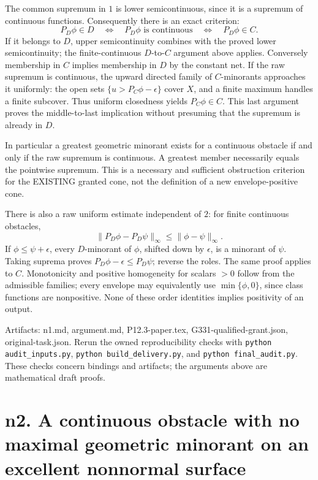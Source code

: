 \documentclass[11pt]{article}
\begin{document}
The common supremum in \(1\) is lower semicontinuous, since it is a supremum of continuous functions. Consequently there is an exact criterion:
\[
P_D\phi\in D
\quad\Longleftrightarrow\quad
P_D\phi\text{ is continuous}
\quad\Longleftrightarrow\quad
P_D\phi\in C. \tag{2}
\]
If it belongs to \(D\), upper semicontinuity combines with the proved lower semicontinuity; the finite-continuous \(D\)-to-\(C\) argument above applies. Conversely membership in \(C\) implies membership in \(D\) by the constant net. If the raw supremum is continuous, the upward directed family of \(C\)-minorants approaches it uniformly: the open sets \(\{u>P_C\phi-\epsilon\}\) cover \(X\), and a finite maximum handles a finite subcover. Thus uniform closedness yields \(P_C\phi\in C\). This last argument proves the middle-to-last implication without presuming that the supremum is already in \(D\).

In particular a greatest geometric minorant exists for a continuous obstacle if and only if the raw supremum is continuous. A greatest member necessarily equals the pointwise supremum. This is a necessary and sufficient obstruction criterion for the EXISTING granted cone, not the definition of a new envelope-positive cone.

There is also a raw uniform estimate independent of \(2\): for finite continuous obstacles,
\[
\|P_D\phi-P_D\psi\|_\infty\le\|\phi-\psi\|_\infty. \tag{3}
\]
If \(\phi\le\psi+\epsilon\), every \(D\)-minorant of \(\phi\), shifted down by \(\epsilon\), is a minorant of \(\psi\). Taking suprema proves \(P_D\phi-\epsilon\le P_D\psi\); reverse the roles. The same proof applies to \(C\). Monotonicity and positive homogeneity for scalars \(>0\) follow from the admissible families; every envelope may equivalently use \(\min\{\phi,0\}\), since class functions are nonpositive. None of these order identities implies positivity of an output.

Artifacts: n1.md, argument.md, P12.3-paper.tex, G331-qualified-grant.json, original-task.json. Rerun the owned reproducibility checks with \texttt{python audit\_inputs.py}, \texttt{python build\_delivery.py}, and \texttt{python final\_audit.py}. These checks concern bindings and artifacts; the arguments above are mathematical draft proofs.

\section{n2. A continuous obstacle with no maximal geometric minorant on an excellent nonnormal surface}
\end{document}
